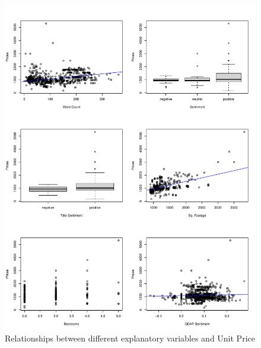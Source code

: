\documentclass[12pt,english]{article}
\begin{document}
\begin{figure}[ht]
\centering
\bigskip{}
\includegraphics[width=.9\linewidth]{craigslist.plots.pdf}
\caption{Relationships between different explanatory variables and Unit Price}
\label{fig:fig2}
\end{figure}


\end{document}
